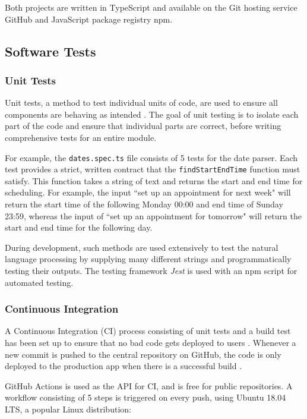 \documentclass{article}
\begin{document}
Both projects are written in TypeScript and available on the Git hosting service GitHub and JavaScript package registry npm.

\subsection{Software Tests}

\subsubsection{Unit Tests}

Unit tests, a method to test individual units of code, are used to ensure all components are behaving as intended \cite{tosun_effectiveness_2018}. The goal of unit testing is to isolate each part of the code and ensure that individual parts are correct, before writing comprehensive tests for an entire module.

For example, the \texttt{dates.spec.ts} file consists of 5 tests for the date parser. Each test provides a strict, written contract that the \texttt{findStartEndTime} function must satisfy. This function takes a string of text and returns the start and end time for scheduling. For example, the input ``set up an appointment for next week" will return the start time of the following Monday 00:00 and end time of Sunday 23:59, whereas the input of ``set up an appointment for tomorrow" will return the start and end time for the following day.

During development, such methods are used extensively to test the natural language processing by supplying many different strings and programmatically testing their outputs. The testing framework \emph{Jest} is used with an npm script for automated testing.

\subsubsection{Continuous Integration}

A Continuous Integration (CI) process consisting of unit tests and a build test has been set up to ensure that no bad code gets deployed to users \cite{li_extensive_2020}. Whenever a new commit is pushed to the central repository on GitHub, the code is only deployed to the production app when there is a successful build \cite{noauthor_what_2019}.

GitHub Actions is used as the API for CI, and is free for public repositories. A workflow consisting of 5 steps is triggered on every push, using Ubuntu  18.04 LTS, a popular Linux distribution:
\end{document}
